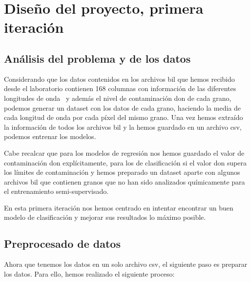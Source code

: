 \section{Diseño del proyecto, primera iteración}

\subsection{Análisis del problema y de los datos}\label{sec:obtencion}

Considerando que los datos contenidos en los archivos \acrshort{bil} que hemos recibido desde el laboratorio contienen 168 columnas con información de las diferentes longitudes de onda\ \cite{WhatIsHy18:online} y además el nivel de contaminación \gls{don} de cada grano, podemos generar un \gls{dataset} con los datos de cada grano, haciendo la media de cada longitud de onda por cada píxel del mismo grano. Una vez hemos extraído la información de todos los archivos \acrshort{bil} y la hemos guardado en un archivo \acrshort{csv}, podemos entrenar los modelos.

Cabe recalcar que para los modelos de regresión nos hemos guardado el valor de contaminación \gls{don} explícitamente, para los de clasificación si el valor \gls{don} supera los límites de contaminación y hemos preparado un \gls{dataset} aparte con algunos archivos \gls{bil} que contienen granos que no han sido analizados químicamente para el entrenamiento semi-supervisado.

En esta primera iteración nos hemos centrado en intentar encontrar un buen modelo de clasificación y mejorar sus resultados lo máximo posible.

\subsection{Preprocesado de datos}\label{sec:preprocesado}

Ahora que tenemos los datos en un solo archivo \acrshort{csv}, el siguiente paso es preparar los datos. Para ello, hemos realizado el siguiente proceso: 

